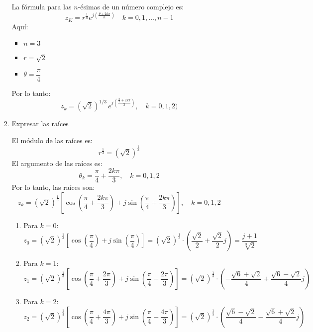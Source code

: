 \begin{enumerate}[label=\color{red}\textbf{\arabic*)}]
\begin{itemize}[label=\textbullet]
\begin{enumerate}[label=Paso \arabic*:]
                    La fórmula para las $n$-ésimas de un número complejo es:  \[
                    z_K=r^{\frac{1}{n} }e^{j\left( \frac{\theta+2k\pi}{n}  \right) }\quad k=0,1,\dots,n-1 
                    \] 
                    Aquí: 
                    \begin{itemize}[label=\textbullet]
                        \item $n=3$
                        \item  $r=\sqrt{2} $ 
                        \item $\theta=\dfrac{\pi}{4}$
                    \end{itemize}
                    Por lo tanto:
                    \[
                    z_k = \left(\sqrt{2}\right)^{1/3} \, e^{j\left(\frac{\frac{\pi}{4} + 2k\pi}{3}\right)}, \quad k = 0, 1, 2)
                    \] 
                \item Expresar las raíces

                    El módulo de las raíces es: \[
                    r^{\frac{1}{3} }=\left( \sqrt{2}  \right) ^{\frac{1}{3} }
                    \] 
                    El argumento de las raíces es: \[
                    \theta_k=\dfrac{\pi}{4} +\dfrac{2k\pi}{3},\quad k=0,1,2
                    \]
                    Por lo tanto, las raíces son: \[
                    z_k=\left( \sqrt{2}  \right) ^{\frac{1}{3} }\left[ \cos\left( \dfrac{\pi}{4}+\dfrac{2k\pi}{3}  \right) +j\sin\left( \dfrac{\pi}{4}+\dfrac{2k\pi}{3} \right)  \right] ,\quad k=0,1,2
                    \] 
                    \begin{enumerate}[label=\arabic*)]
                        \item Para $k=0$: \[
                        z_0=\left( \sqrt{2}  \right) ^{\frac{1}{3}}\left[ \cos\left( \dfrac{\pi}{4} \right) +j\sin\left( \dfrac{\pi}{4} \right)  \right] =\left( \sqrt{2}  \right) ^{\frac{1}{3} }\cdot \left( \dfrac{\sqrt{2} }{2}+\dfrac{\sqrt{2} }{2}j \right) =\dfrac{j+1}{\sqrt[3]{2} }
                        \] 
                    \item Para $k=1$:  \[
                    z_1=\left( \sqrt{2}  \right) ^{\frac{1}{3} }\left[ \cos\left( \dfrac{\pi}{4}+\dfrac{2\pi}{3} \right) +j\sin\left( \dfrac{\pi}{4}+\dfrac{2\pi}{3} \right)  \right] =\left( \sqrt{2}  \right) ^{\frac{1}{3} }\cdot \left( -\dfrac{\sqrt{6} +\sqrt{2} }{4}+\dfrac{\sqrt{6} -\sqrt{2} }{4}j \right) 
                    \] 
                \item Para $k=2$:
                     \[
                    z_2=\left( \sqrt{2}  \right) ^{\frac{1}{3} }\left[ \cos\left( \dfrac{\pi}{4}+\dfrac{4\pi}{3} \right) +j\sin\left( \dfrac{\pi}{4}+\dfrac{4\pi}{3} \right)  \right] =\left( \sqrt{2}  \right) ^{\frac{1}{3} }\cdot \left( \dfrac{\sqrt{6} -\sqrt{2} }{4}-\dfrac{\sqrt{6} +\sqrt{2} }{4}j \right) 
                    \] 
                    \end{enumerate}
                \end{enumerate}
        \end{itemize}
        

\end{enumerate}
